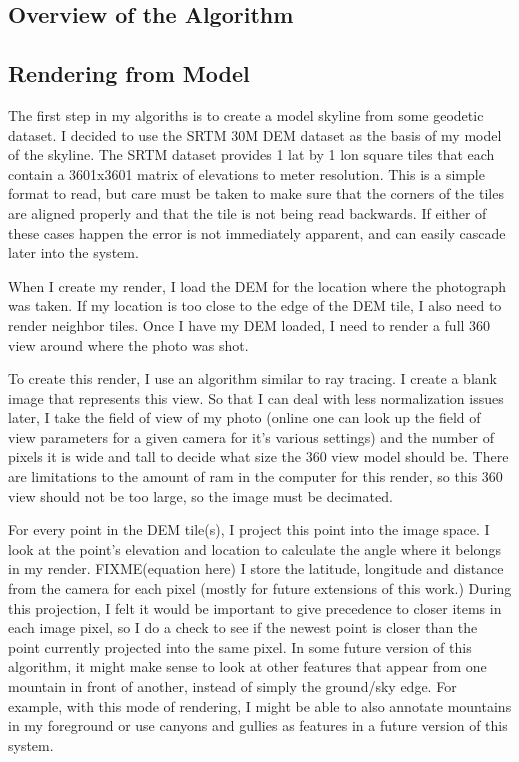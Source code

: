 \documentclass{acm_proc_article-sp}
\begin{document}
\subsection{Overview of the Algorithm}

\subsection{Rendering from Model}

The first step in my algoriths is to create a model skyline from some geodetic dataset.  I decided to use the  SRTM 30M DEM dataset as the basis of my model of the skyline.  The SRTM dataset provides 1 lat by 1 lon square tiles that each contain a 3601x3601 matrix of elevations to meter resolution.  This is a simple format to read, but care must be taken to make sure that the corners of the tiles are aligned properly and that the tile is not being read backwards. If either of these cases happen the error is not immediately apparent, and can easily cascade later into the system.  

When I create my render, I load the DEM for the location where the photograph was taken.   If my location is too close to the edge of the DEM tile, I also need to render  neighbor tiles.  Once I have my DEM loaded, I need to render a full 360 view around where the photo was shot.  

To create this render, I use an algorithm similar to ray tracing.  I create a blank image that represents this view.  So that I can deal with less normalization issues later, I take the field of view of my photo (online one can look up the field of view parameters for a given camera for it’s various settings) and the number of pixels it is wide and tall to decide what size the 360 view model should be.  There are limitations to the amount of ram in the computer for this render, so this 360 view should not be too large, so the image must be decimated.

For every point in the DEM tile(s), I project this point into the image space.  I look at the point’s elevation and location to calculate the angle where it belongs in my render.  FIXME(equation here) I store the latitude, longitude and distance from the camera for each pixel (mostly for future extensions of this work.) During this projection, I felt it would be important to give precedence to closer items in each image pixel, so I do a check to see if the newest point is closer than the point currently projected into the same pixel.  In some future version of this algorithm, it might make sense to look at other features that appear from one mountain in front of another, instead of simply the ground/sky edge. For example, with this mode of rendering, I might be able to also annotate mountains in my foreground or use canyons and gullies as features in a future version of this system.
\end{document}
